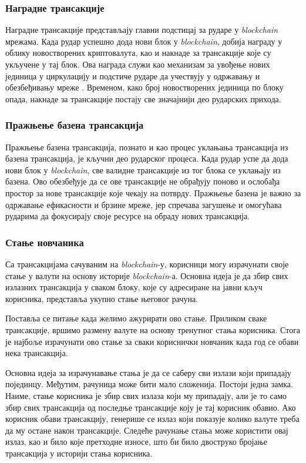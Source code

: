 \documentclass[12pt, a4paper]{article}
\begin{document}
\newpage
\subsubsection{Наградне трансакције}
Наградне трансакције представљају главни подстицај за рударе у \textit{blockchain} мрежама. Када рудар успешно дода нови блок у \textit{blockchain}, добија награду у облику новостворених криптовалута, као и накнаде за трансакције које су укључене у тај блок. Ова награда служи као механизам за увођење нових јединица у циркулацију и подстиче рударе да учествују у одржавању и обезбеђивању мреже \cite{13}. Временом, како број новостворених јединица по блоку опада, накнаде за трансакције постају све значајнији део рударских прихода.

\subsubsection{Пражњење базена трансакција}
Пражњење базена трансакција, познато и као процес уклањања трансакција из базена трансакција, је кључни део рударског процеса. Када рудар успе да дода нови блок у \textit{blockchain}, све валидне трансакције из тог блока се уклањају из базена. Ово обезбеђује да се ове трансакције не обрађују поново и ослобађа простор за нове трансакције које чекају на потврду. Пражњење базена је важно за одржавање ефикасности и брзине мреже, јер спречава загушење и омогућава рударима да фокусирају своје ресурсе на обраду нових трансакција.

\subsubsection{Стање новчаника}
Са трансакцијама сачуваним на \textit{blockchain}-у, корисници могу израчунати своје стање у валути на основу историје \textit{blockchain}-а. Основна идеја је да збир свих излазних трансакција у сваком блоку, које су адресиране на јавни кључ корисника, представља укупно стање његовог рачуна.

Поставља се питање када желимо ажурирати ово стање. Приликом сваке трансакције, вршимо размену валуте на основу тренутног стања корисника. Стога је најбоље израчунати ово стање за сваки кориснички новчаник када год се обави нека трансакција. 

Основна идеја за израчунавање стања је да се саберу сви излази који припадају појединцу. Међутим, рачуница може бити мало сложенија. Постоји једна замка. Наиме, стање корисника је збир свих излаза који му припадају, али је то само збир свих трансакција од последње трансакције коју је тај корисник обавио. Ако корисник обави трансакцију, генерише се излаз који показује колико валуте треба да му остане након трансакције. Следеће рачунање стања може користити овај излаз, као и било које претходне износе, што би било двоструко бројање трансакција у историји стања корисника.
\end{document}
